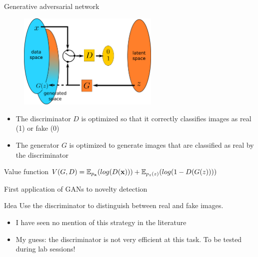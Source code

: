 \documentclass[xcolor=pdftex,dvipsnames,table,mathserif]{beamer}
\begin{document}
\begin{frame}{Generative adversarial network \cite{goodfellow_generative_2014}}

  \begin{figure}[ht]
    \centering
    \includegraphics[width=0.6\textwidth]{gan2}
  \end{figure}

  \begin{itemize}
  \item The discriminator $D$ is optimized so that it correctly classifies images as real (1) or fake (0)
  \item The generator $G$ is optimized to generate images that are classified as real by the discriminator
  \end{itemize}

  \begin{block}{Value function}
    $V(G,D) = \mathbb{E}_{p_{\mathbf{x}}}(log(D(\mathbf{x}))) + \mathbb{E}_{p_z(z)}(log(1 - D(G(z))))$
  \end{block}

\end{frame}


\begin{frame}{First application of GANs to novelty detection}

  \begin{block}{Idea}
    Use the discriminator to distinguish between real and fake images.
  \end{block}

  \begin{itemize}
  \item I have seen no mention of this strategy in the literature
  \item My guess: the discriminator is not very efficient at this task. To be tested during lab sessions!
  \end{itemize}

\end{frame}
\end{document}
